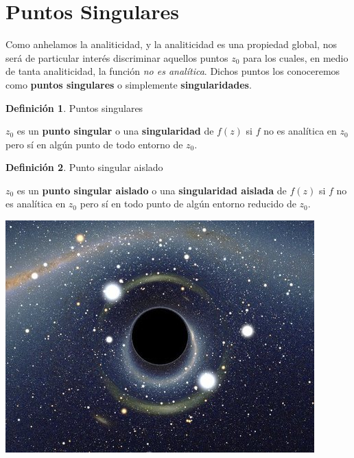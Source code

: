 \documentclass[12pt]{article}
\theoremstyle{definition}
\newtheorem{definition}{Definici\'on}[section]
\theoremstyle{theorem}
\theoremstyle{corolary}
\begin{document}
\section{Puntos Singulares}
Como anhelamos la analiticidad, y la analiticidad es una propiedad global, nos ser\'a de particular inter\'es discriminar aquellos puntos $z_0$ para los cuales, en medio de tanta analiticidad, la funci\'on \textit{no es anal\'itica}. Dichos puntos los conoceremos como \textbf{puntos singulares} o simplemente \textbf{singularidades}.\\

\colorbox{blue!40!white!80}{\parbox{\linewidth}{
 \theoremstyle{definition}
 \begin{definition}{Puntos singulares}

  	$z_0$ es un \textbf{punto singular} o una \textbf{singularidad} de $f(z)$ si $f$ no es anal\'itica en $z_0$ pero s\'i en alg\'un punto de todo entorno de $z_0$.
 \end{definition}}}
\linebreak
\linebreak

\colorbox{blue!40!white!80}{\parbox{\linewidth}{
 \theoremstyle{definition}
 \begin{definition}{Punto singular aislado}

  	$z_0$ es un \textbf{punto singular aislado} o una \textbf{singularidad aislada} de $f(z)$ si $f$ no es anal\'itica en $z_0$ pero s\'i en todo punto de alg\'un entorno reducido de $z_0$.
 \end{definition}}}
\linebreak

\begin{center}
	\includegraphics[scale=0.5]{singularidad.jpg}
\end{center}
\end{document}
